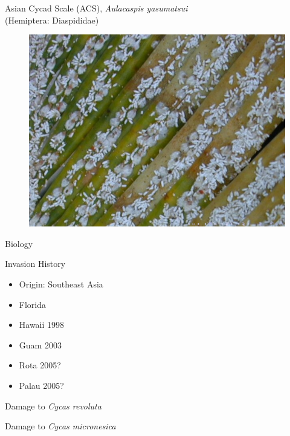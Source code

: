 \documentclass[]{beamer}
\begin{document}
\begin{frame}{Asian Cycad Scale (ACS), \textit{Aulacaspis yasumatsui}\\(Hemiptera: Diaspididae)}
	\begin{figure}
		\includegraphics[height=0.7\textheight]{asian-cycad-scale/output-07.png}
	\end{figure}
\end{frame}


\begin{frame}{Biology}
\end{frame}

\begin{frame}{Invasion History}
	\begin{itemize}
		\item Origin: Southeast Asia
		\item Florida
		\item Hawaii 1998
		\item Guam 2003
		\item Rota 2005?
		\item Palau 2005?
	\end{itemize}
\end{frame}

\begin{frame}{Damage to \textit{Cycas revoluta}}
\end{frame}

\begin{frame}{Damage to \textit{Cycas micronesica}}
\end{frame}
\end{document}
